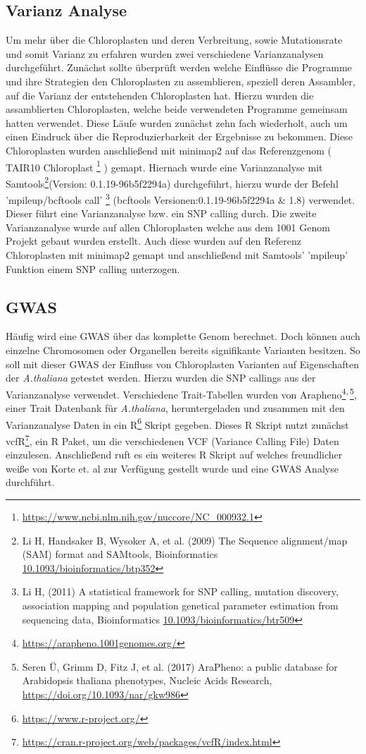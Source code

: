 \documentclass{scrartcl}
\begin{document}
\subsection{Varianz Analyse}
\label{sec-3-2}
Um mehr über die Chloroplasten und deren Verbreitung, sowie Mutationsrate und somit Varianz zu erfahren wurden zwei verschiedene Varianzanalysen durchgeführt. 
Zunächst sollte überprüft werden welche Einflüsse die Programme und ihre Strategien den Chloroplasten zu assemblieren, speziell deren Assambler, auf die Varianz der 
entstehenden Chloroplasten hat. Hierzu wurden die assamblierten Chloroplasten, welche beide verwendeten Programme gemeinsam hatten verwendet. Diese Läufe wurden zunächst
zehn fach wiederholt, auch um einen Eindruck über die Reproduzierbarkeit der Ergebnisse zu bekommen. Diese Chloroplasten wurden anschließend mit minimap2 \footnotemark[53]{} auf das 
Referenzgenom ( TAIR10 Chloroplast \footnote{\url{https://www.ncbi.nlm.nih.gov/nuccore/NC_000932.1}} ) gemapt. Hiernach wurde eine Varianzanalyse mit Samtools\footnote{Li H, Handsaker B, Wysoker A, et al. (2009) The Sequence alignment/map (SAM) format and SAMtools, Bioinformatics \url{10.1093/bioinformatics/btp352}}(Version: 0.1.19-96b5f2294a) durchgeführt, hierzu wurde der Befehl
'mpileup/bcftools call' \footnote{Li H, (2011) A statistical framework for SNP calling, mutation discovery, association mapping and population genetical parameter estimation from sequencing data, Bioinformatics  \url{10.1093/bioinformatics/btr509}} (bcftools Versionen:0.1.19-96b5f2294a \& 1.8) verwendet. Dieser führt eine Varianzanalyse bzw. ein SNP calling durch. Die zweite Varianzanalyse wurde auf allen Chloroplasten welche aus dem
1001 Genom Projekt gebaut wurden erstellt. Auch diese wurden auf den Referenz Chloroplasten mit minimap2 gemapt und anschließend mit Samtools' 'mpileup' Funktion einem
SNP calling unterzogen. 

\subsection{GWAS}
\label{sec-3-3}
Häufig wird eine GWAS über das komplette Genom berechnet. Doch können auch einzelne Chromosomen oder Organellen bereits signifikante Varianten besitzen. 
So soll mit dieser GWAS der Einfluss von Chloroplasten Varianten auf Eigenschaften der \emph{A.thaliana} getestet werden. Hierzu wurden die SNP callings aus der Varianzanalyse verwendet.
Verschiedene Trait-Tabellen wurden von Arapheno\footnote{\url{https://arapheno.1001genomes.org/}}\textsuperscript{,}\,\footnote{Seren Ü, Grimm D, Fitz J, et al. (2017) AraPheno: a public database for Arabidopsis thaliana phenotypes, Nucleic Acids Research, \url{https://doi.org/10.1093/nar/gkw986}}, einer Trait Datenbank für \emph{A.thaliana}, heruntergeladen und zusammen mit den Varianzanalyse Daten in ein R\footnote{\url{https://www.r-project.org/}} Skript gegeben.
Dieses R Skript nutzt zunächst vcfR\footnote{\url{https://cran.r-project.org/web/packages/vcfR/index.html}}, ein R Paket, um die verschiedenen VCF (Variance Calling File) Daten einzulesen. Anschließend ruft es ein weiteres R Skript auf welches
freundlicher weiße von Korte et. al\footnotemark[46]{} zur Verfügung gestellt wurde und eine GWAS Analyse durchführt.
\end{document}
